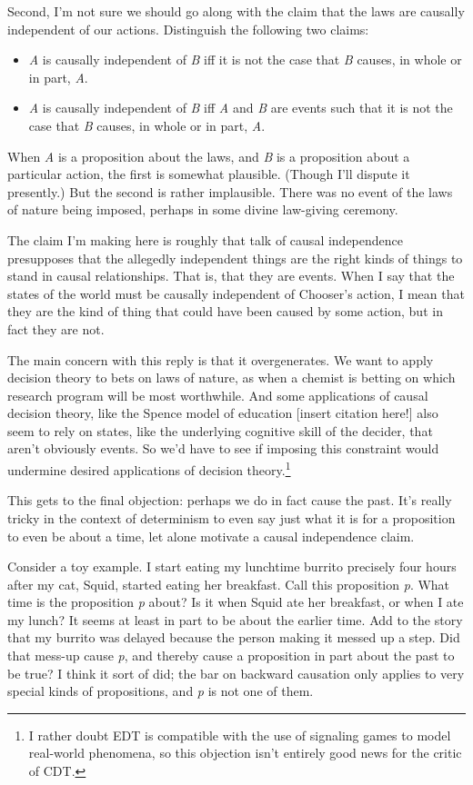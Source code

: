 \documentclass[
  12pt,
  letterpaper,
  DIV=11,
  numbers=noendperiod]{scrreprt}
\providecommand{\tightlist}{%
  \setlength{\itemsep}{0pt}\setlength{\parskip}{0pt}}\usepackage{longtable,booktabs,array}
\begin{document}
Second, I'm not sure we should go along with the claim that the laws are
causally independent of our actions. Distinguish the following two
claims:

\begin{itemize}
\tightlist
\item
  \emph{A} is causally independent of \emph{B} iff it is not the case
  that \emph{B} causes, in whole or in part, \emph{A}.
\item
  \emph{A} is causally independent of \emph{B} iff \emph{A} and \emph{B}
  are events such that it is not the case that \emph{B} causes, in whole
  or in part, \emph{A}.
\end{itemize}

When \emph{A} is a proposition about the laws, and \emph{B} is a
proposition about a particular action, the first is somewhat plausible.
(Though I'll dispute it presently.) But the second is rather
implausible. There was no event of the laws of nature being imposed,
perhaps in some divine law-giving ceremony.

The claim I'm making here is roughly that talk of causal independence
presupposes that the allegedly independent things are the right kinds of
things to stand in causal relationships. That is, that they are events.
When I say that the states of the world must be causally independent of
Chooser's action, I mean that they are the kind of thing that could have
been caused by some action, but in fact they are not.

The main concern with this reply is that it overgenerates. We want to
apply decision theory to bets on laws of nature, as when a chemist is
betting on which research program will be most worthwhile. And some
applications of causal decision theory, like the Spence model of
education {[}insert citation here!{]} also seem to rely on states, like
the underlying cognitive skill of the decider, that aren't obviously
events. So we'd have to see if imposing this constraint would undermine
desired applications of decision theory.\footnote{I rather doubt EDT is
  compatible with the use of signaling games to model real-world
  phenomena, so this objection isn't entirely good news for the critic
  of CDT.}

This gets to the final objection: perhaps we do in fact cause the past.
It's really tricky in the context of determinism to even say just what
it is for a proposition to even be about a time, let alone motivate a
causal independence claim.

Consider a toy example. I start eating my lunchtime burrito precisely
four hours after my cat, Squid, started eating her breakfast. Call this
proposition \emph{p}. What time is the proposition \emph{p} about? Is it
when Squid ate her breakfast, or when I ate my lunch? It seems at least
in part to be about the earlier time. Add to the story that my burrito
was delayed because the person making it messed up a step. Did that
mess-up cause \emph{p}, and thereby cause a proposition in part about
the past to be true? I think it sort of did; the bar on backward
causation only applies to very special kinds of propositions, and
\emph{p} is not one of them.
\end{document}
